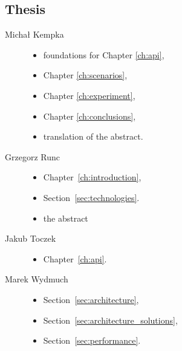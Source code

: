    	
	\subsection{Thesis}
	\begin{description}
		\item[Michał Kempka] \hfill
			\begin{itemize}
				\item foundations for Chapter \ref{ch:api},
				\item Chapter \ref{ch:scenarios},
				\item Chapter \ref{ch:experiment},
				\item Chapter \ref{ch:conclusions},
				\item translation of the abstract.
			\end{itemize}
		\item[Grzegorz Runc] \hfill
			\begin{itemize}
				\item Chapter~\ref{ch:introduction},
				\item Section~\ref{sec:technologies}.
                \item the abstract
			\end{itemize}
		\item[Jakub Toczek] \hfill
			\begin{itemize}
				\item Chapter~\ref{ch:api}.
			\end{itemize}
		\item[Marek Wydmuch] \hfill
			\begin{itemize}
				\item Section~\ref{sec:architecture},
				\item Section~\ref{sec:architecture_solutions},
				\item Section~\ref{sec:performance}.
			\end{itemize}
	\end{description}
